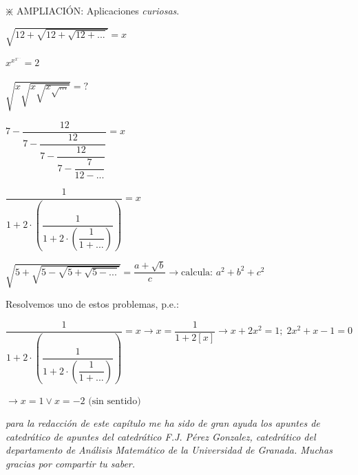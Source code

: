 		
		
	$\divideontimes$ AMPLIACIÓN: Aplicaciones \emph{curiosas}. \label{curiosidades1}
		
		\begin{multicols}{2}
			
		
		$\sqrt{12+\sqrt{12+\sqrt{12+...}}}=x$  
		
		
		$x^{x^{x^{...}}}=2$
		
		
		$\sqrt {x \sqrt {x \sqrt {x \sqrt {...}}}}=?$
		
		$7-\dfrac {12}{7-\dfrac {12}{7-\dfrac {12}{7-\dfrac {7}{12- ...}}}}=x$
		
		$\dfrac {1}{1+2\cdot \left( \dfrac {1}{1+2\cdot \left( \dfrac {1}{1+ ...} \right)} \right)}=x$
		
		$\sqrt{5+\sqrt{5-\sqrt{5+\sqrt{5- ...}}}}=\dfrac {a+\sqrt{b}}{c} \to \mbox{calcula: } a^2+b^2+c^2$
		
		\end{multicols}
		
		
		\textcolor{gris} {Resolvemos uno de estos problemas, p.e.:}
		
		\textcolor{gris} {$\dfrac {1}{1+2\cdot \left( \dfrac {1}{1+2\cdot \left( \dfrac {1}{1+ ...} \right)} \right)}=x \to x=\dfrac {1}{1+2[x]} \to x+2x^2=1;\; 2x^2+x-1=0$}
		
		\textcolor{gris} {$\to x=1 \vee x=-2 \mbox{ (sin sentido)}$ }


\vspace{4mm}

\textit{para la redacción de este capítulo me ha sido de gran ayuda los apuntes de catedrático de apuntes del catedrático F.J. Pérez Gonzalez, catedrático del departamento de Análisis Matemático de la Universidad de Granada. Muchas gracias por compartir tu saber.}

